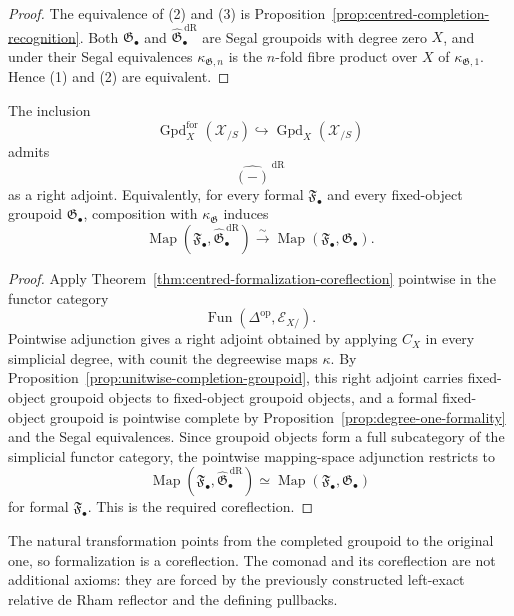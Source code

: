 \begin{proof}
The equivalence of (2) and (3) is
Proposition~\ref{prop:centred-completion-recognition}.  Both
$\mathfrak G_\bullet$ and
$\widehat{\mathfrak G}^{\,\mathrm{dR}}_\bullet$ are Segal groupoids with
degree zero $X$, and under their Segal equivalences
$\kappa_{\mathfrak G,n}$ is the $n$-fold fibre product over $X$ of
$\kappa_{\mathfrak G,1}$.  Hence (1) and (2) are equivalent.
\end{proof}

\begin{theorem}
\label{thm:formalization-coreflection}
The inclusion
\[
    \operatorname{Gpd}^{\mathrm{for}}_X(\mathcal X_{/S})
    \hookrightarrow
    \operatorname{Gpd}_X(\mathcal X_{/S})
\]
admits
\[
    \widehat{(-)}^{\,\mathrm{dR}}
\]
as a right adjoint.  Equivalently, for every formal
$\mathfrak F_\bullet$ and every fixed-object groupoid
$\mathfrak G_\bullet$, composition with $\kappa_{\mathfrak G}$ induces
\[
    \operatorname{Map}
    \left(
        \mathfrak F_\bullet,
        \widehat{\mathfrak G}^{\,\mathrm{dR}}_\bullet
    \right)
    \xrightarrow{\sim}
    \operatorname{Map}
    \left(
        \mathfrak F_\bullet,
        \mathfrak G_\bullet
    \right).
\]
\end{theorem}

\begin{proof}
Apply Theorem~\ref{thm:centred-formalization-coreflection} pointwise in the
functor category
\[
    \operatorname{Fun}
    \left(
        \Delta^{\mathrm{op}},
        \mathcal E_{X/}
    \right).
\]
Pointwise adjunction gives a right adjoint obtained by applying $C_X$ in every
simplicial degree, with counit the degreewise maps $\kappa$.  By
Proposition~\ref{prop:unitwise-completion-groupoid}, this right adjoint carries
fixed-object groupoid objects to fixed-object groupoid objects, and a formal
fixed-object groupoid is pointwise complete by
Proposition~\ref{prop:degree-one-formality} and the Segal equivalences.
Since groupoid objects form a full subcategory of the simplicial functor
category, the pointwise mapping-space adjunction restricts to
\[
    \operatorname{Map}
    \left(
        \mathfrak F_\bullet,
        \widehat{\mathfrak G}^{\,\mathrm{dR}}_\bullet
    \right)
    \simeq
    \operatorname{Map}
    \left(
        \mathfrak F_\bullet,
        \mathfrak G_\bullet
    \right)
\]
for formal $\mathfrak F_\bullet$.  This is the required coreflection.
\end{proof}

\begin{remark}
The natural transformation points from the completed groupoid to the original
one, so formalization is a coreflection.  The comonad and its coreflection are
not additional axioms: they are forced by the previously constructed
left-exact relative de Rham reflector and the defining pullbacks.
\end{remark}


